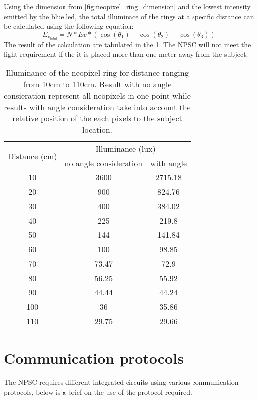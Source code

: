 Using the dimension from \cref{fig:neopixel_ring_dimension} and the lowest intensity emitted by the blue led, the total illuminace of the rings at a specific distance can be calculated using the following equation:
\begin{equation}\label{eq:total_illuminance}
E_{v_{total}} = N*Ev*(\cos(\theta_1)+\cos(\theta_2)+\cos(\theta_3))
\end{equation}
The result of the calculation are tabulated in the \cref{table:neopixel_illuminance}. The NPSC will not meet the light requirement if the it is placed more than one meter away from the subject.
\begin{table}[h!]
\centering
\begin{tabular}{ccc}
\hline
\hline
\multirow{2}{*}{Distance (cm)}  & \multicolumn{2}{c}{Illuminance (lux)} \\  
 & no angle consideration & with angle \\
\hline
10 & 3600 & 2715.18\\
20 & 900 & 824.76\\
30 & 400 & 384.02\\
40 & 225 & 219.8\\
50 & 144 & 141.84\\
60 & 100 & 98.85\\
70 & 73.47 & 72.9\\
80 & 56.25 & 55.92\\
90 & 44.44 & 44.24\\
100 & 36 & 35.86\\
110 & 29.75 & 29.66\\
\hline
\hline
\end{tabular}
\caption{Illuminance of the neopixel ring for distance ranging from 10cm to 110cm. Result with no angle consieration represent all neopixels in one point while results with angle consideration take into account the relative position of the each pixels to the subject location.}
\label{table:neopixel_illuminance}
\end{table}
\section{Communication protocols}
The NPSC requires different integrated circuits using various communication protocols, below is a brief on the use of the protocol required.

